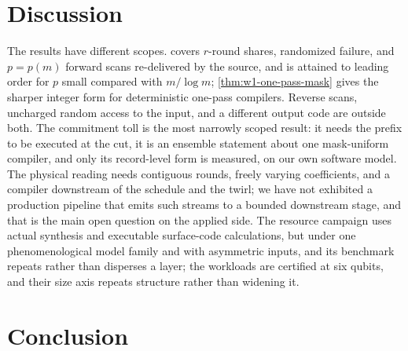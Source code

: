\documentclass[aps,prx,reprint,superscriptaddress,floatfix,longbibliography]{revtex4-2}
\begin{document}
\section{Discussion}
\label{sec:discussion}

The results have different scopes.   covers
$r$-round shares, randomized failure, and $p=p(m)$ forward scans re-delivered
by the source, and is attained to leading order for $p$ small compared
with $m/\log m$; \cref{thm:w1-one-pass-mask} gives the sharper integer form
for deterministic one-pass compilers.  Reverse scans, uncharged random
access to the input, and a different output code are outside both.  The
commitment toll is the most narrowly scoped result: it needs the prefix to
be executed at the cut, it is an ensemble statement about one mask-uniform
compiler, and only its record-level form is measured, on our own software
model.
The physical reading needs contiguous rounds, freely varying coefficients,
and a compiler downstream of the schedule and the twirl; we have not
exhibited a production pipeline that emits such streams to a bounded
downstream stage, and that is the main open question on the applied side.
The resource campaign uses actual synthesis and executable surface-code
calculations, but under one phenomenological model family and with
asymmetric inputs, and its benchmark repeats rather than disperses a
layer; the workloads are certified at six qubits, and their size axis
repeats structure rather than widening it.

\section{Conclusion}
\label{sec:conclusion}
\end{document}
